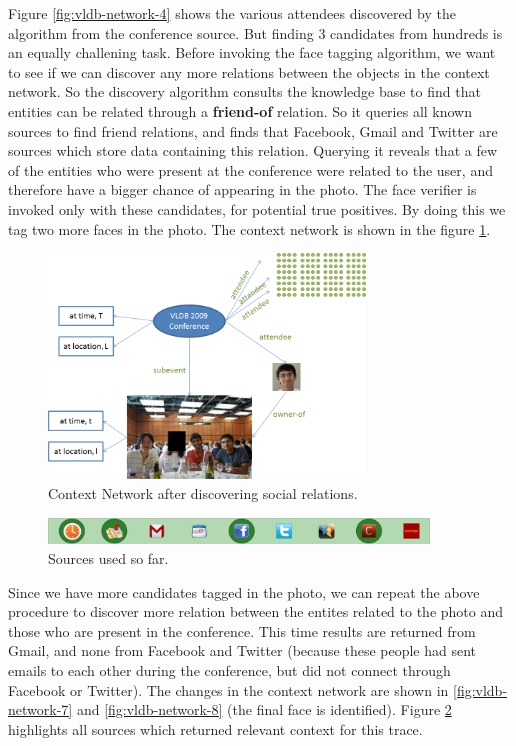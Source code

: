 Figure \ref{fig:vldb-network-4} shows the various attendees discovered by the algorithm from the conference source. But finding 3 candidates from hundreds is an equally challening task. Before invoking the face tagging algorithm, we want to see if we can discover any more relations between the objects in the context network. So the discovery algorithm consults the knowledge base to find that entities can be related through a \textbf{friend-of} relation. So it queries all known sources to find friend relations, and finds that Facebook, Gmail and Twitter are sources which store data containing this relation. Querying it reveals that a few of the entities who were present at the conference were related to the user, and therefore have a bigger chance of appearing in the photo. The face verifier is invoked only with these candidates, for potential true positives. By doing this we tag two more faces in the photo. The context network is shown in the figure \ref{fig:vldb-network-6}.

\begin{figure}[h]
\centering
\includegraphics[width=0.75\textwidth]{media/chapter4/stacktrace/vldb-network-6.png}
\caption{Context Network after discovering social relations.}
\label{fig:vldb-network-6}
\end{figure}
\begin{figure}[h]
\centering
\includegraphics[width=0.9\textwidth]{media/chapter4/stacktrace/vldb-source-2.png}
\caption{Sources used so far.}
\label{fig:vldb-network-3}
\end{figure}

Since we have more candidates tagged in the photo, we can repeat the above procedure to discover more relation between the entites related to the photo and those who are present in the conference. This time results are returned from Gmail, and none from Facebook and Twitter (because these people had sent emails to each other during the conference, but did not connect through Facebook or Twitter). The changes in the context network are shown in \ref{fig:vldb-network-7} and \ref{fig:vldb-network-8} (the final face is identified). Figure \ref{fig:vldb-network-3} highlights all sources which returned relevant context for this trace. 

